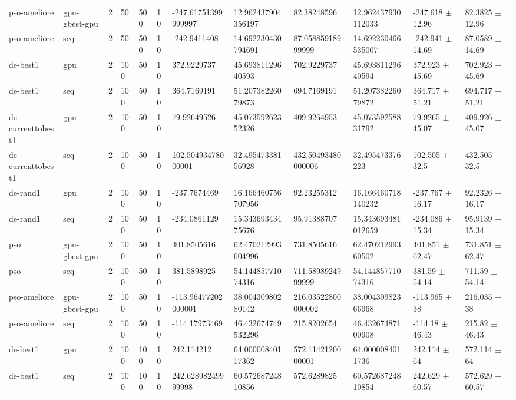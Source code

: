 \begin{table}[t]
\begin{tabular}{llllllllllll}
pso-ameliore & gpu-gbest-gpu & 2 & 50 & 500 & 10 & -247.61751399999997 & 12.962437904356197 & 82.38248596 & 12.962437930112033 & -247.618 $\pm$ 12.96 & 82.3825 $\pm$ 12.96 \\
pso-ameliore & seq & 2 & 50 & 500 & 10 & -242.9411408 & 14.692230430794691 & 87.05885918999999 & 14.692230466535007 & -242.941 $\pm$ 14.69 & 87.0589 $\pm$ 14.69 \\
de-best1 & gpu & 2 & 100 & 50 & 10 & 372.9229737 & 45.69381129640593 & 702.9229737 & 45.69381129640594 & 372.923 $\pm$ 45.69 & 702.923 $\pm$ 45.69 \\
de-best1 & seq & 2 & 100 & 50 & 10 & 364.7169191 & 51.20738226079873 & 694.7169191 & 51.20738226079872 & 364.717 $\pm$ 51.21 & 694.717 $\pm$ 51.21 \\
de-currenttobest1 & gpu & 2 & 100 & 50 & 10 & 79.92649526 & 45.07359262352326 & 409.9264953 & 45.07359258831792 & 79.9265 $\pm$ 45.07 & 409.926 $\pm$ 45.07 \\
de-currenttobest1 & seq & 2 & 100 & 50 & 10 & 102.50493478000001 & 32.49547338156928 & 432.50493480000006 & 32.495473376223 & 102.505 $\pm$ 32.5 & 432.505 $\pm$ 32.5 \\
de-rand1 & gpu & 2 & 100 & 50 & 10 & -237.7674469 & 16.166460756707956 & 92.23255312 & 16.166460718140232 & -237.767 $\pm$ 16.17 & 92.2326 $\pm$ 16.17 \\
de-rand1 & seq & 2 & 100 & 50 & 10 & -234.0861129 & 15.34369343475676 & 95.91388707 & 15.343693481012659 & -234.086 $\pm$ 15.34 & 95.9139 $\pm$ 15.34 \\
pso & gpu-gbest-gpu & 2 & 100 & 50 & 10 & 401.8505616 & 62.470212993604996 & 731.8505616 & 62.47021299360502 & 401.851 $\pm$ 62.47 & 731.851 $\pm$ 62.47 \\
pso & seq & 2 & 100 & 50 & 10 & 381.5898925 & 54.14485771074316 & 711.5898924999999 & 54.14485771074316 & 381.59 $\pm$ 54.14 & 711.59 $\pm$ 54.14 \\
pso-ameliore & gpu-gbest-gpu & 2 & 100 & 50 & 10 & -113.96477202000001 & 38.00430980280142 & 216.03522800000002 & 38.00430982366968 & -113.965 $\pm$ 38 & 216.035 $\pm$ 38 \\
pso-ameliore & seq & 2 & 100 & 50 & 10 & -114.17973469 & 46.432674749532296 & 215.8202654 & 46.43267487100908 & -114.18 $\pm$ 46.43 & 215.82 $\pm$ 46.43 \\
de-best1 & gpu & 2 & 100 & 100 & 10 & 242.114212 & 64.00000840117362 & 572.1142120000001 & 64.0000084011736 & 242.114 $\pm$ 64 & 572.114 $\pm$ 64 \\
de-best1 & seq & 2 & 100 & 100 & 10 & 242.62898249999998 & 60.57268724810856 & 572.6289825 & 60.57268724810854 & 242.629 $\pm$ 60.57 & 572.629 $\pm$ 60.57 \\

\end{tabular}
\end{table}
